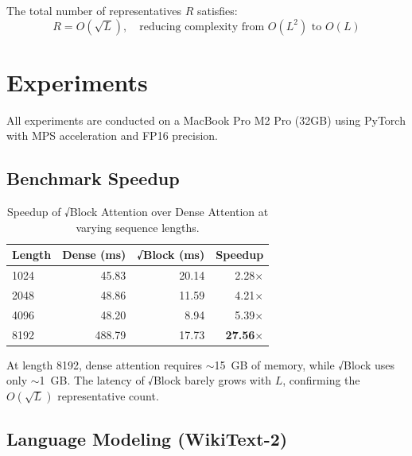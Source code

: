 \documentclass[11pt,a4paper]{article}
\begin{document}
The total number of representatives $R$ satisfies:
\begin{equation}
R = O(\sqrt{L}), \quad \text{reducing complexity from } O(L^2) \text{ to } O(L)
\label{eq:complexity}
\end{equation}

\section{Experiments}
\label{sec:experiments}

All experiments are conducted on a MacBook Pro M2 Pro (32GB) using PyTorch with MPS acceleration and FP16 precision.

\subsection{Benchmark Speedup}

\begin{table}[h]
\centering
\caption{Speedup of √Block Attention over Dense Attention at varying sequence lengths.}
\label{tab:speedup}
\begin{tabular}{lrrr}
\toprule
Length & Dense (ms) & √Block (ms) & Speedup \\
\midrule
1024   & 45.83 & 20.14 & 2.28$\times$ \\
2048   & 48.86 & 11.59 & 4.21$\times$ \\
4096   & 48.20 &  8.94 & 5.39$\times$ \\
8192   & 488.79& 17.73 & \textbf{27.56$\times$} \\
\bottomrule
\end{tabular}
\end{table}

At length 8192, dense attention requires $\sim$15~GB of memory, while √Block uses only $\sim$1~GB. The latency of √Block barely grows with $L$, confirming the $O(\sqrt{L})$ representative count.

\subsection{Language Modeling (WikiText-2)}
\end{document}
